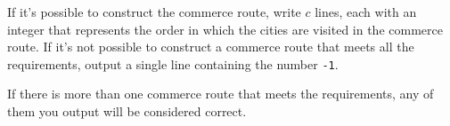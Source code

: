 If it's possible to construct the commerce route, write $c$ lines, each
with an integer that represents the order in which the cities are visited
in the commerce route. If it's not possible to construct a commerce
route that meets all the requirements, output a single line containing
the number \texttt{-1}.

If there is more than one commerce route that meets the requirements, any of them you
output will be considered correct.